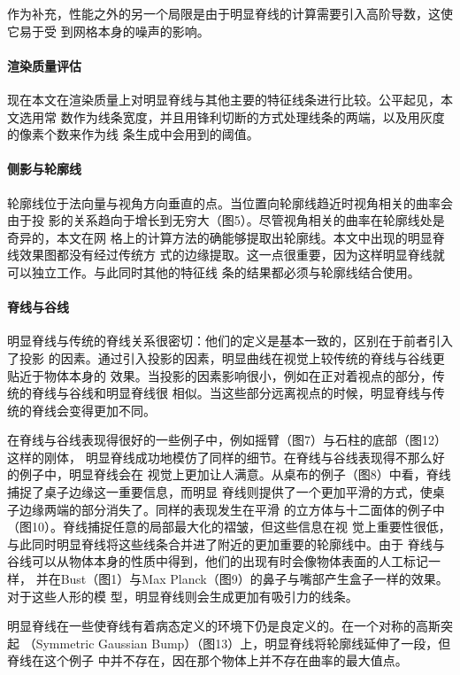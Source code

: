 \documentclass[10pt,a4paper]{article}
\theoremstyle{mythm}%
\numberwithin{equation}{section}
\begin{document}
\begin{CJK*}{UTF8}{wqyzh}
作为补充，性能之外的另一个局限是由于明显脊线的计算需要引入高阶导数，这使它易于受
到网格本身的噪声的影响。

\paragraph*{渲染质量评估}
现在本文在渲染质量上对明显脊线与其他主要的特征线条进行比较。公平起见，本文选用常
数作为线条宽度，并且用锋利切断的方式处理线条的两端，以及用灰度的像素个数来作为线
条生成中会用到的阈值。

\paragraph*{侧影与轮廓线}
轮廓线位于法向量与视角方向垂直的点。当位置向轮廓线趋近时视角相关的曲率会由于投
影的关系趋向于增长到无穷大（图5）。尽管视角相关的曲率在轮廓线处是奇异的，本文在网
格上的计算方法的确能够提取出轮廓线。本文中出现的明显脊线效果图都没有经过传统方
式的边缘提取。这一点很重要，因为这样明显脊线就可以独立工作。与此同时其他的特征线
条的结果都必须与轮廓线结合使用。

\paragraph*{脊线与谷线}
明显脊线与传统的脊线关系很密切：他们的定义是基本一致的，区别在于前者引入了投影
的因素。通过引入投影的因素，明显曲线在视觉上较传统的脊线与谷线更贴近于物体本身的
效果。当投影的因素影响很小，例如在正对着视点的部分，传统的脊线与谷线和明显脊线很
相似。当这些部分远离视点的时候，明显脊线与传统的脊线会变得更加不同。

在脊线与谷线表现得很好的一些例子中，例如摇臂（图7）与石柱的底部（图12）这样的刚体，
明显脊线成功地模仿了同样的细节。在脊线与谷线表现得不那么好的例子中，明显脊线会在
视觉上更加让人满意。从桌布的例子（图8）中看，脊线捕捉了桌子边缘这一重要信息，而明显
脊线则提供了一个更加平滑的方式，使桌子边缘两端的部分消失了。同样的表现发生在平滑
的立方体与十二面体的例子中（图10）。脊线捕捉任意的局部最大化的褶皱，但这些信息在视
觉上重要性很低，与此同时明显脊线将这些线条合并进了附近的更加重要的轮廓线中。由于
脊线与谷线可以从物体本身的性质中得到，他们的出现有时会像物体表面的人工标记一样，
并在Bust（图1）与Max Planck（图9）的鼻子与嘴部产生盒子一样的效果。对于这些人形的模
型，明显脊线则会生成更加有吸引力的线条。

明显脊线在一些使脊线有着病态定义的环境下仍是良定义的。在一个对称的高斯突起
（Symmetric Gaussian Bump）（图13）上，明显脊线将轮廓线延伸了一段，但脊线在这个例子
中并不存在，因在那个物体上并不存在曲率的最大值点。


\end{CJK*}
\end{document}
